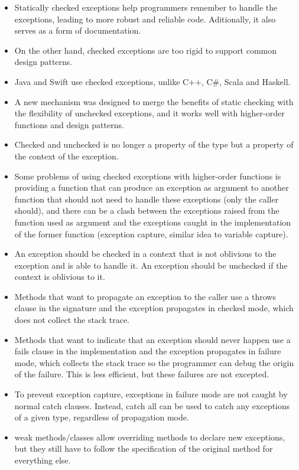 \documentclass[a4paper,11pt]{article}
\theoremstyle{plain}
\theoremstyle{nonumberplain}
\begin{document}
\begin{itemize}
  \item Statically checked exceptions help programmers remember to handle the exceptions, leading to more robust and reliable code. Aditionally, it also serves as a form of documentation.
  \item On the other hand, checked exceptions are too rigid to support common design patterns.
  \item Java and Swift use checked exceptions, unlike C++, C\#, Scala and Haskell.
  \item A new mechanism was designed to merge the benefits of static checking with the flexibility of unchecked exceptions, and it works well with higher-order functions and design patterns.
  \item Checked and unchecked is no longer a property of the type but a property of the context of the exception.
  \item Some problems of using checked exceptions with higher-order functions is providing a function that can produce an exception as argument to another function that should not need to handle these exceptions (only the caller should), and there can be a clash between the exceptions raised from the function used as argument and the exceptions caught in the implementation of the former function (exception capture, similar idea to variable capture).
  \item An exception should be checked in a context that is not oblivious to the exception and is able to handle it. An exception should be unchecked if the context is oblivious to it.
  \item Methods that want to propagate an exception to the caller use a throws clause in the signature and the exception propagates in checked mode, which does not collect the stack trace.
  \item Methods that want to indicate that an exception should never happen use a fails clause in the implementation and the exception propagates in failure mode, which collects the stack trace so the programmer can debug the origin of the failure. This is less efficient, but these failures are not excepted.
  \item To prevent exception capture, exceptions in failure mode are not caught by normal catch clauses. Instead, catch all can be used to catch any exceptions of a given type, regardless of propagation mode.
  \item weak methods/classes allow overriding methods to declare new exceptions, but they still have to follow the specification of the original method for everything else.

\end{itemize}
\end{document}
